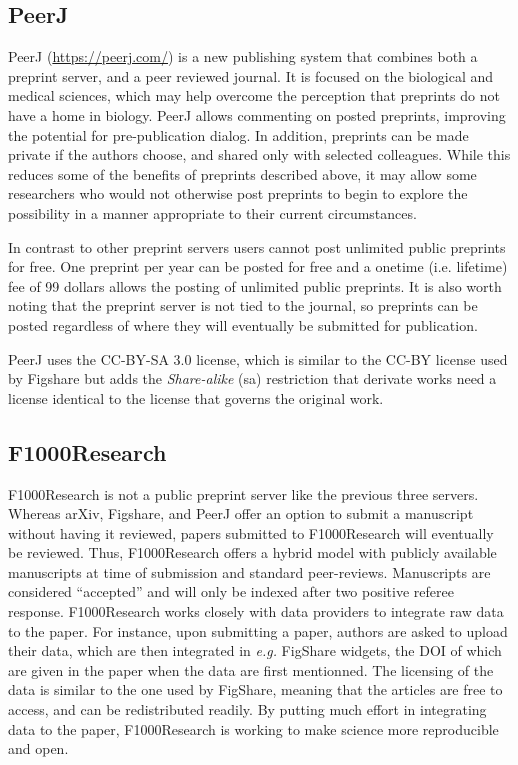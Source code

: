 \documentclass[letterpaper,twocolumn,superscriptaddress,showkeys,longbibliography]{revtex4-1}
\begin{document}
\subsection{PeerJ}

PeerJ (\href{https://peerj.com/}{https://peerj.com/}) is a new publishing system
that combines both a preprint server, and a peer reviewed journal.  It is
focused on the biological and medical sciences, which may help overcome the
perception that preprints do not have a home in biology.  PeerJ allows
commenting on posted preprints, improving the potential for pre-publication
dialog. In addition, preprints can be made private if the authors choose, and
shared only with selected colleagues. While this reduces some of the benefits of
preprints described above, it may allow some researchers who would not otherwise
post preprints to begin to explore the possibility in a manner appropriate to
their current circumstances.

In contrast to other preprint servers users cannot post unlimited public
preprints for free. One preprint per year can be posted for free and a onetime
(i.e. lifetime) fee of 99 dollars allows the posting of unlimited public
preprints. It is also worth noting that the preprint server is not tied to the
journal, so preprints can be posted regardless of where they will eventually be
submitted for publication.

PeerJ uses the CC-BY-SA 3.0 license, which is similar to the CC-BY license used
by Figshare but adds the \emph{Share-alike} (sa) restriction that derivate works
need a license identical to the license that governs the original work.

\subsection{F1000Research}

F1000Research is not a public preprint server like the previous three servers.
Whereas arXiv, Figshare, and PeerJ offer an option to submit a manuscript
without having it reviewed, papers submitted to F1000Research will eventually
be reviewed. Thus, F1000Research offers a hybrid model with publicly available
manuscripts at time of submission and standard peer-reviews. Manuscripts are
considered ``accepted'' and will only be indexed after two positive referee %
response. F1000Research works closely with data providers to integrate raw
data to the paper. For instance, upon submitting a paper, authors are asked to
upload their data, which are then integrated in \emph{e.g.} FigShare widgets,
the DOI of which are given in the paper when the data are first mentionned.
The licensing of the data is similar to the one used by FigShare, meaning that
the articles are free to access, and can be redistributed readily. By putting
much effort in integrating data to the paper, F1000Research is working to make
science more reproducible and open.
\end{document}
